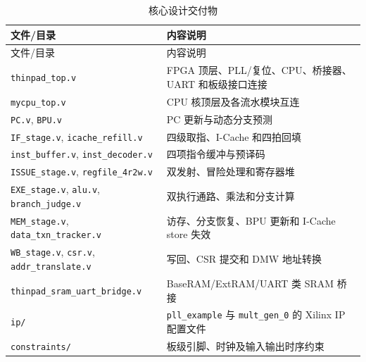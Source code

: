 \documentclass[UTF8,a4paper,zihao=5,fontset=none]{ctexart}
\newcommand{\code}[1]{\nolinkurl{#1}}
\begin{document}
\begin{longtable}{p{4.2cm} p{10.0cm}}
  \caption{核心设计交付物}\label{tab:deliverables}                                                                          \\
  \toprule
  文件/目录                                                    & 内容说明                                                    \\
  \midrule
  \endfirsthead
  \toprule
  文件/目录                                                    & 内容说明                                                    \\
  \midrule
  \endhead
  \code{thinpad_top.v}                                     & FPGA 顶层、PLL/复位、CPU、桥接器、UART 和板级接口连接                     \\
  \code{mycpu_top.v}                                       & CPU 核顶层及各流水模块互连                                         \\
  \code{PC.v}, \code{BPU.v}                                & PC 更新与动态分支预测                                            \\
  \code{IF_stage.v}, \code{icache_refill.v}                & 四级取指、I-Cache 和四拍回填                                      \\
  \code{inst_buffer.v}, \code{inst_decoder.v}              & 四项指令缓冲与预译码                                              \\
  \code{ISSUE_stage.v}, \code{regfile_4r2w.v}              & 双发射、冒险处理和寄存器堆                                           \\
  \code{EXE_stage.v}, \code{alu.v}, \code{branch_judge.v}  & 双执行通路、乘法和分支计算                                           \\
  \code{MEM_stage.v}, \code{data_txn_tracker.v}            & 访存、分支恢复、BPU 更新和 I-Cache store 失效                        \\
  \code{WB_stage.v}, \code{csr.v}, \code{addr_translate.v} & 写回、CSR 提交和 DMW 地址转换                                     \\
  \code{thinpad_sram_uart_bridge.v}                        & BaseRAM/ExtRAM/UART 类 SRAM 桥接                           \\
  \code{ip/}                                               & \code{pll_example} 与 \code{mult_gen_0} 的 Xilinx IP 配置文件 \\
  \code{constraints/}                                      & 板级引脚、时钟及输入输出时序约束                                        \\
  \bottomrule
\end{longtable}
\end{document}
